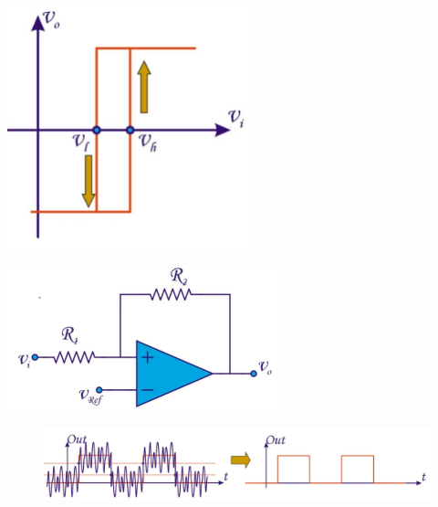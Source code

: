 \begin{minipage}{.5\textwidth}
	\centering
	\includegraphics[width=7cm]{figures/ch15/schmidt4.jpg}
	\label{fig:schmidt4}
\end{minipage}%
\begin{minipage}{.5\textwidth}
	\centering
	\includegraphics[width=8cm]{figures/ch15/schmidt6.jpg}
	\label{fig:schmidt6}
\end{minipage}

\begin{figure}[h!]
	\centering
	\includegraphics[width=16cm]{figures/ch15/schmidt5.jpg}
	\caption{}
	\label{fig:schmidt5}
\end{figure}

